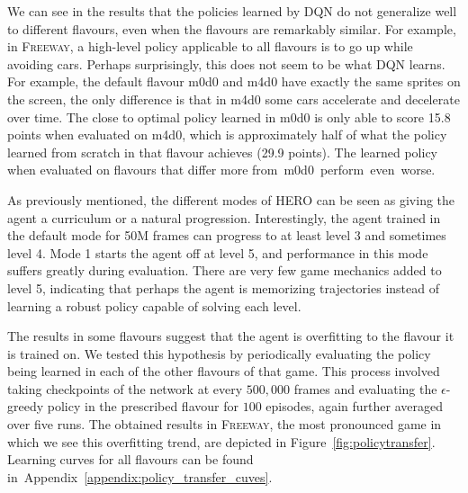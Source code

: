 \documentclass{article}
\begin{document}
We can see in the results that the policies learned by DQN do not generalize well to different flavours, even when the flavours are remarkably similar. For example, in \textsc{Freeway}, a high-level policy applicable to all flavours is to go up while avoiding cars. Perhaps surprisingly, this does not seem to be what DQN learns. For example, the default flavour m0d0 and m4d0 have exactly the same sprites on the screen, the only difference is that in m4d0 some cars accelerate and decelerate over time. The close to optimal policy learned in m0d0 is only able to score 15.8 points when evaluated on m4d0, which is approximately half of what the policy learned from scratch in that flavour achieves (29.9 points). The learned policy when evaluated on flavours that differ more from~m0d0~perform~even~worse. 


As previously mentioned, the different modes of \textsc{HERO} can be seen as giving the agent a curriculum or a natural progression. Interestingly, the agent trained in the default mode for 50M frames can progress to at least level 3 and sometimes level 4. Mode 1 starts the agent off at level 5, and performance in this mode suffers greatly during evaluation. There are very few game mechanics added to level 5, indicating that perhaps the agent is memorizing trajectories instead of learning a robust policy capable of solving each level.

The results in some flavours suggest that the agent is overfitting to the flavour it is trained on. We tested this hypothesis by periodically evaluating the policy being learned in each of the other flavours of that game. This process involved taking checkpoints of the network at every $500,000$ frames and evaluating the $\epsilon$-greedy policy in the prescribed flavour for $100$ episodes, again further averaged over five runs. The obtained results in \textsc{Freeway}, the most pronounced game in which we see this overfitting trend, are depicted in Figure~\ref{fig:policytransfer}. Learning curves for all flavours can be found in~Appendix~\ref{appendix:policy_transfer_cuves}.
\end{document}
